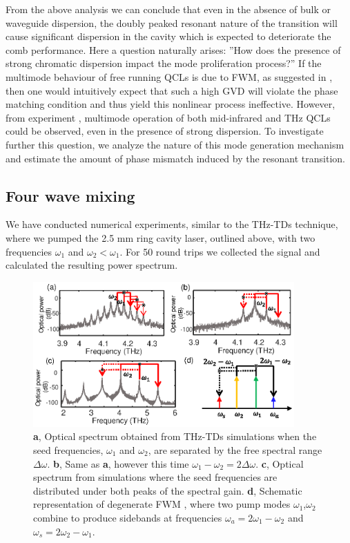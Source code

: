 \documentclass[10pt]{article}
\begin{document}
	From the above analysis we can conclude that even in the absence of bulk or
	waveguide dispersion, the doubly peaked resonant nature of the transition will
	cause significant dispersion in the cavity which is expected to deteriorate
	the comb performance. Here a question naturally arises: ''How does the
	presence of strong chromatic dispersion impact the mode proliferation
	process?'' If the multimode behaviour of free running QCLs is due to FWM, as
	suggested in \cite{friedli2013four,khurgin2014coherent}, then one would
	intuitively expect that such a high GVD will violate the phase matching
	condition and thus yield this nonlinear process ineffective. However, from
	experiment \cite{burghoff2014terahertz,rosch2015octave}, multimode operation
	of both mid-infrared and THz QCLs could be observed, even in the presence of
	strong dispersion. To investigate further this question, we analyze the
	nature of this mode generation mechanism and estimate the amount of phase
	mismatch induced by the resonant transition.
	
	\subsection{Four wave mixing}
	\label{subsec:FWM}
	We have conducted numerical experiments, similar to the THz-TDs technique,
	where we pumped the 2.5 mm ring cavity laser, outlined above, with two frequencies
	$\omega_{1}$ and $\omega_{2}<\omega_{1}$. For 50 round trips we collected the
	signal and calculated the resulting power spectrum.
	
	\begin{figure}[h!]
		\begin{center}
			\includegraphics[width=10cm]{FWM.eps}
		\end{center}
		\caption{\textbf{a}, Optical spectrum
			obtained from THz-TDs simulations when the seed frequencies, $\omega_{1}$ and
			$\omega_{2}$, are separated by the free spectral range $\Delta\omega$.
			\textbf{b}, Same as \textbf{a}, however this time $\omega_{1}-\omega
			_{2}=2\Delta\omega$. \textbf{c}, Optical spectrum from simulations where the
			seed frequencies are distributed under both peaks of the spectral gain.
			\textbf{d}, Schematic representation of degenerate FWM
			\cite{butcher1991elements}, where two pump modes $\omega_{1}$,$\omega_{2}$
			combine to produce sidebands at frequencies $\omega_{a}=2\omega_{1}-\omega
			_{2}$ and $\omega_{s}=2\omega_{2}-\omega_{1}$.}%
		\label{fig:img04}%
	\end{figure}
	
\end{document}
